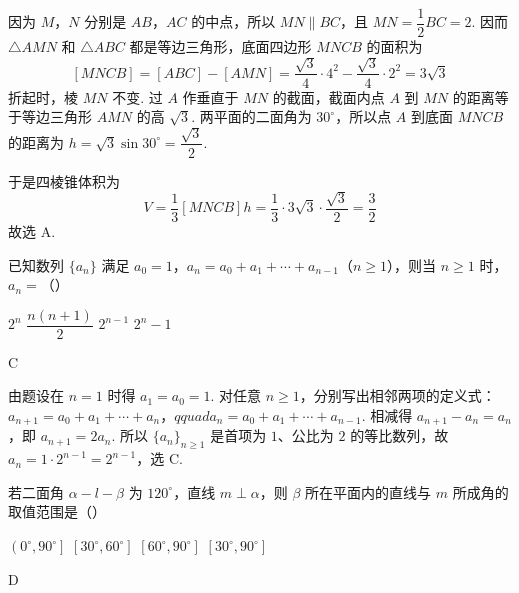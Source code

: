 \begin{solution}
因为 \(M\)，\(N\) 分别是 \(AB\)，\(AC\) 的中点，所以 \(MN\parallel BC\)，且 \(MN=\dfrac12BC=2\). 因而 \(\triangle AMN\) 和 \(\triangle ABC\) 都是等边三角形，底面四边形 \(MNCB\) 的面积为
\[
[MNCB]=[ABC]-[AMN]=\frac{\sqrt{3}}{4}\cdot4^{2}-\frac{\sqrt{3}}{4}\cdot2^{2}=3\sqrt{3}
\]
折起时，棱 \(MN\) 不变. 过 \(A\) 作垂直于 \(MN\) 的截面，截面内点 \(A\) 到 \(MN\) 的距离等于等边三角形 \(AMN\) 的高 \(\sqrt{3}\). 两平面的二面角为 \(30^{\circ}\)，所以点 \(A\) 到底面 \(MNCB\) 的距离为
\(h=\sqrt{3}\sin30^{\circ}=\dfrac{\sqrt{3}}{2}\).

于是四棱锥体积为
\[
V=\frac13[MNCB]h=\frac13\cdot3\sqrt{3}\cdot\frac{\sqrt{3}}2=\frac32
\]
故选 A.
\end{solution}

\begin{problem}
已知数列 \(\{a_{n}\}\) 满足 \(a_{0}=1\)，\(a_{n}=a_{0}+a_{1}+\cdots+a_{n-1}\)（\(n\geqslant1\)），则当 \(n\geqslant1\) 时，\(a_{n}=\)（\quad）

\choices
    {\(2^{n}\)}
    {\(\dfrac{n(n+1)}{2}\)}
    {\(2^{n-1}\)}
    {\(2^{n}-1\)}
\end{problem}

\begin{answer}
C
\end{answer}

\begin{solution}
由题设在 \(n=1\) 时得 \(a_{1}=a_{0}=1\). 对任意 \(n\geqslant1\)，分别写出相邻两项的定义式：
\(a_{n+1}=a_{0}+a_{1}+\cdots+a_{n}\)，\(qquad a_{n}=a_{0}+a_{1}+\cdots+a_{n-1}\).
相减得 \(a_{n+1}-a_{n}=a_{n}\)，即 \(a_{n+1}=2a_{n}\). 所以 \(\{a_n\}_{n\geqslant1}\) 是首项为 \(1\)、公比为 \(2\) 的等比数列，故
\(a_{n}=1\cdot2^{n-1}=2^{n-1}\)，选 C.
\end{solution}

\begin{problem}
若二面角 \(\alpha-l-\beta\) 为 \(120^{\circ}\)，直线 \(m\perp\alpha\)，则 \(\beta\) 所在平面内的直线与 \(m\) 所成角的取值范围是（\quad）

\choices
    {\(\left(0^{\circ},90^{\circ}\right]\)}
    {\(\left[30^{\circ},60^{\circ}\right]\)}
    {\(\left[60^{\circ},90^{\circ}\right]\)}
    {\(\left[30^{\circ},90^{\circ}\right]\)}
\end{problem}

\begin{answer}
D
\end{answer}

